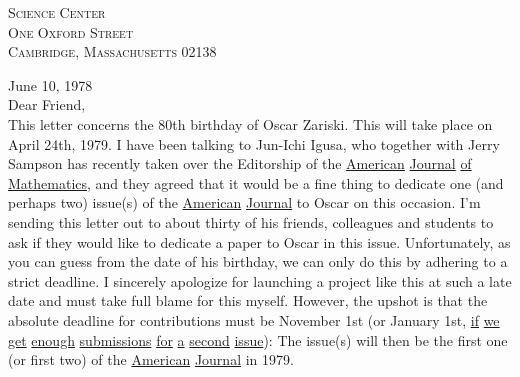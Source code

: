 
\textsc{Science Center}\\
\textsc{One Oxford Street}\\
\textsc{Cambridge, Massachusetts} 02138

June 10, 1978\\

Dear Friend,\\

This letter concerns the 80th birthday of Oscar Zariski. This will take place on April 24th, 1979. I have been talking to Jun-Ichi Igusa, who together with Jerry Sampson has recently taken over the Editorship of the \uline{American} \uline{Journal} \uline{of} \uline{Mathematics}, and they agreed that it would be a fine thing to dedicate one (and perhaps two) issue(s) of the \uline{American} \uline{Journal} to Oscar on this occasion. I'm sending this letter out to about thirty of his friends, colleagues and students to ask if they would like to dedicate a paper to Oscar in this issue. Unfortunately, as you can guess from the date of his birthday, we can only do this by adhering to a strict deadline. I sincerely apologize for launching a project like this at such a late date and must take full blame for this myself. However, the upshot is that the absolute deadline for contributions must be November 1st (or January 1st, \uline{if} \uline{we} \uline{get} \uline{enough} \uline{submissions} \uline{for} \uline{a} \uline{second} \uline{issue}): The issue(s) will then be the first one (or first two) of the \uline{American} \uline{Journal} in 1979.

